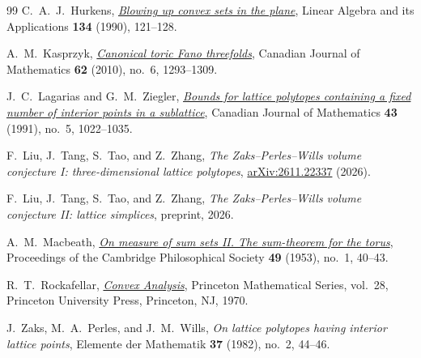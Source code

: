 \documentclass[reqno, 11pt]{article}
\numberwithin{equation}{section}
\theoremstyle{definition}
\begin{document}
\begin{thebibliography}{99}
C.~A.~J.~Hurkens, \href{https://doi.org/10.1016/0024-3795(90)90010-A}{\emph{Blowing up convex sets in the plane}},
Linear Algebra and its Applications \textbf{134} (1990), 121--128.

A.~M.~Kasprzyk, \href{https://doi.org/10.4153/CJM-2010-070-3}{\emph{Canonical toric Fano threefolds}},
Canadian Journal of Mathematics \textbf{62} (2010), no.~6, 1293--1309.

J.~C.~Lagarias and G.~M.~Ziegler, \href{https://doi.org/10.4153/CJM-1991-058-4}{\emph{Bounds for lattice polytopes
containing a fixed number of interior points in a sublattice}},
Canadian Journal of Mathematics \textbf{43} (1991), no.~5, 1022--1035.

F.~Liu, J.~Tang, S.~Tao, and Z.~Zhang,
\emph{The Zaks--Perles--Wills volume conjecture I:
three-dimensional lattice polytopes}, \href{https://arxiv.org/abs/2611.22337}{arXiv:2611.22337} (2026).

F.~Liu, J.~Tang, S.~Tao, and Z.~Zhang,
\emph{The Zaks--Perles--Wills volume conjecture II: lattice simplices},
preprint, 2026.

A.~M.~Macbeath,
\href{https://doi.org/10.1017/S0305004100028012}{\emph{On measure of sum sets II. The sum-theorem for the torus}},
Proceedings of the Cambridge Philosophical Society \textbf{49}
(1953), no.~1, 40--43.

R.~T.~Rockafellar, \href{https://doi.org/10.1515/9781400873173}{\emph{Convex Analysis}},
Princeton Mathematical Series, vol.~28, Princeton University Press,
Princeton, NJ, 1970.

J.~Zaks, M.~A.~Perles, and J.~M.~Wills,
\emph{On lattice polytopes having interior lattice points},
Elemente der Mathematik \textbf{37} (1982), no.~2, 44--46.

\end{thebibliography}
\end{document}
